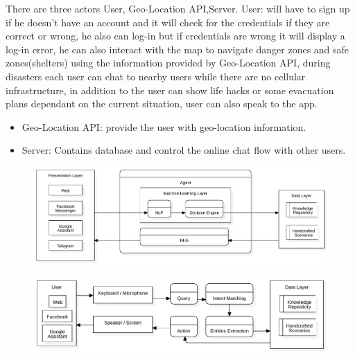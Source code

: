 \documentclass{scrreprt}
\begin{document}
There are three actors User, Geo-Location API,Server. User: will have to sign up if he doesn't have an account and it will check for the credentials if they are correct or wrong, he also can log-in but if credentials are wrong it will display a log-in error,
he can also interact with the map to navigate danger zones and safe zones(shelters) using the information provided by Geo-Location API, during disasters each user can chat to nearby users while there are no cellular infrastructure, in addition to the user can show life hacks or some evacuation plans dependant on the current situation, user can also speak to the app.
\begin{itemize}
    \item Geo-Location API: provide the user with geo-location information.
    \item Server: Contains database and control the online chat flow with other users.
\end{itemize}


\clearpage
\begin{figure}[ht!]
    \centering
    \includegraphics[angle=90, height=\textheight]{imgs/DFDDiagram1.pdf}
    \label{fig:dfd1}
\end{figure}

\clearpage

\begin{figure}[ht!]
    \centering
    \includegraphics[angle=90, height=\textheight]{imgs/DFDDiagram2.pdf}
    \label{fig:my_label}
\end{figure}
\end{document}
